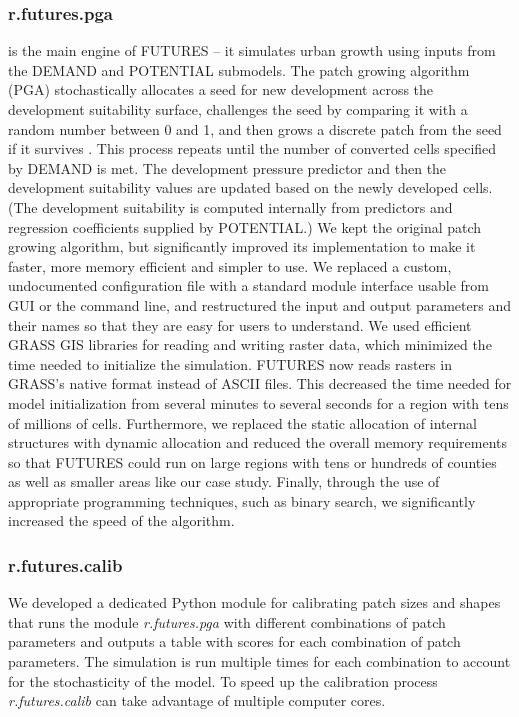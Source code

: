 \documentclass{isprs}
\begin{document}
\subsubsection{r.futures.pga}
is the main engine of FUTURES -- it simulates urban growth using inputs from the
DEMAND and POTENTIAL submodels.
The patch growing algorithm (PGA) sto\-chasti\-cally allocates
a seed for new development across the development suitability surface,
challenges the seed by comparing it with a random number between 0 and 1, and
then grows a discrete patch from the seed if it survives \cite{Meentemeyer2012}. 
This process repeats
until the number of converted cells specified by DEMAND is met.
The development pressure predictor and then
the development suitability values are updated based on the newly developed cells.
(The development suitability is computed internally
from predictors and regression coefficients supplied by POTENTIAL.)
We kept the original patch growing algorithm,
but significantly improved its implementation to make it
faster, more memory efficient and simpler to use.
We replaced a custom, undocumented configuration file with a standard module interface
usable from GUI or the command line, and restructured the input and output
parameters and their names so that they are easy for users to understand. 
We used efficient GRASS GIS libraries for reading and writing raster data,
which minimized the time needed to initialize the simulation.
FUTURES now reads rasters in GRASS's native format
instead of ASCII files. 
This decreased the time needed for model initialization from several minutes to several seconds
for a region with tens of millions of cells.
Furthermore, we replaced the static allocation of internal structures with dynamic allocation
and reduced the overall memory requirements 
so that FUTURES could run on large regions with tens or hundreds of counties
as well as smaller areas like our case study.
Finally, through the use of appropriate programming techniques, such as binary search, we significantly increased the
speed of the algorithm.

\subsubsection{r.futures.calib}
We developed a dedicated Python module for calibrating patch sizes and shapes
that runs the module \emph{r.futures.pga}
with different combinations of patch parameters and outputs a table
with scores for each combination of patch parameters.
%
The simulation is run
multiple times for each combination 
to account for the stochasticity of the model.
To speed up the calibration process \emph{r.futures.calib} can take advantage of multiple
computer cores.
\end{document}
